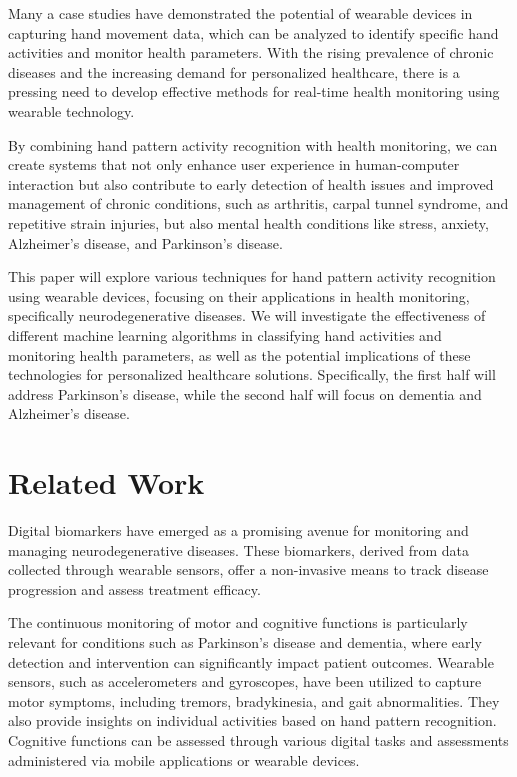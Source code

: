 \documentclass[sigconf,nonacm]{acmart}
\begin{document}
    Many a case studies have demonstrated the potential of wearable devices in capturing hand movement data, which can be analyzed to identify specific hand activities and monitor health parameters. With the rising prevalence of chronic diseases and the increasing demand for personalized healthcare, there is a pressing need to develop effective methods for real-time health monitoring using wearable technology.

    By combining hand pattern activity recognition with health monitoring, we can create systems that not only enhance user experience in human-computer interaction but also contribute to early detection of health issues and improved management of chronic conditions, such as arthritis, carpal tunnel syndrome, and repetitive strain injuries, but also mental health conditions like stress, anxiety, Alzheimer's disease, and Parkinson's disease.

    This paper will explore various techniques for hand pattern activity recognition using wearable devices, focusing on their applications in health monitoring, specifically neurodegenerative diseases. We will investigate the effectiveness of different machine learning algorithms in classifying hand activities and monitoring health parameters, as well as the potential implications of these technologies for personalized healthcare solutions. Specifically, the first half will address Parkinson's disease, while the second half will focus on dementia and Alzheimer's disease.

\section{Related Work}

    Digital biomarkers have emerged as a promising avenue for monitoring and managing neurodegenerative diseases. These biomarkers, derived from data collected through wearable sensors, offer a non-invasive means to track disease progression and assess treatment efficacy.

    The continuous monitoring of motor and cognitive functions is particularly relevant for conditions such as Parkinson's disease and dementia, where early detection and intervention can significantly impact patient outcomes. Wearable sensors, such as accelerometers and gyroscopes, have been utilized to capture motor symptoms, including tremors, bradykinesia, and gait abnormalities. They also provide insights on individual activities based on hand pattern recognition. Cognitive functions can be assessed through various digital tasks and assessments administered via mobile applications or wearable devices.
\end{document}
